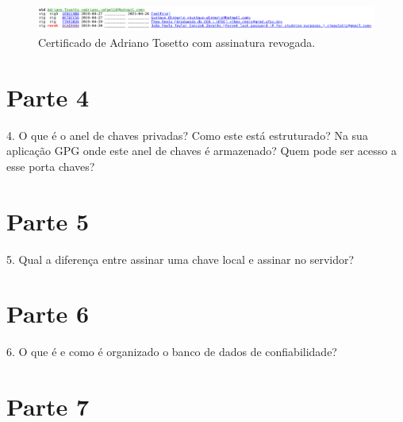 \documentclass{article}
\begin{document}
    \begin{figure}[h]
        \centering
        \includegraphics[keepaspectratio,width=1\textwidth]{tosetto-revoked-sig}
        \caption{%
            Certificado de Adriano Tosetto com assinatura
            revogada.\label{fig:revokeed-sign}
        }
    \end{figure}

    \section{Parte 4}

    \begin{superframe}
        4. O que é o anel de chaves privadas? Como este está estruturado? Na
        sua aplicação GPG onde este anel de chaves é armazenado? Quem pode ser
        acesso a esse porta chaves?
    \end{superframe}

    \section{Parte 5}

    \begin{superframe}
        5. Qual a diferença entre assinar uma chave local e assinar no
        servidor?
    \end{superframe}

    \section{Parte 6}

    \begin{superframe}
        6. O que é e como é organizado o banco de dados de confiabilidade?
    \end{superframe}

    \section{Parte 7}
\end{document}
